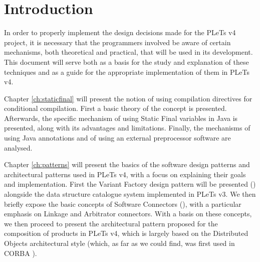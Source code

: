 \chapter*{Introduction}

In order to properly implement the design decisions made for the PLeTs v4 project, it is necessary that the programmers involved be aware of certain mechanisms, both theoretical and practical, that will be used in its development. This document will serve both as a basis for the study and explanation of these techniques and as a guide for the appropriate implementation of them in PLeTs v4.

Chapter \ref{ch:staticfinal} will present the notion of using compilation directives for conditional compilation. First a basic theory of the concept is presented. Afterwards, the specific mechanism of using Static Final variables in Java is presented, along with its advantages and limitations. Finally, the mechanisms of using Java annotations and of using an external preprocessor software are analysed.

Chapter \ref{ch:patterns} will present the basics of the software design patterns and architectural patterns used in PLeTs v4, with a focus on explaining their goals and implementation. First the Variant Factory design pattern will be presented (\cite{LASER:2015}) alongside the data structure catalogue system implemented in PLeTs v3. We then briefly expose the basic concepts of Software Connectors (\cite{TAYLOR:2009}), with a particular emphasis on Linkage and Arbitrator connectors. With a basis on these concepts, we then proceed to present the architectural pattern proposed for the composition of products in PLeTs v4, which is largely based on the Distributed Objects architectural style (which, as far as we could find, was first used in CORBA \cite{CORBA:2012}).
